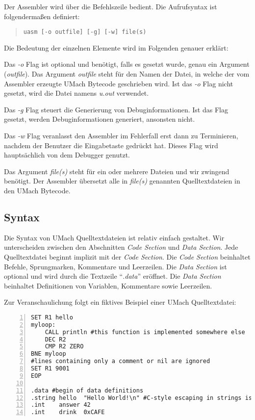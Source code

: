 Der Assembler wird über die Befehlszeile bedient. Die Aufrufsyntax ist folgendermaßen
definiert:
\begin{quote}\texttt{uasm [-o outfile] [-g] [-w] file(s)}\end{quote}
Die Bedeutung der einzelnen Elemente wird im Folgenden genauer erklärt:

Das \emph{-o} Flag ist optional und benötigt, falls es gesetzt wurde, genau ein
Argument (\emph{outfile}). Das Argument \emph{outfile} steht für den Namen der
Datei, in welche der vom Assembler erzeugte UMach Bytecode geschrieben wird. Ist 
das \emph{-o} Flag nicht gesetzt, wird die Datei namens \emph{u.out} verwendet.

Das \emph{-g} Flag steuert die Generierung von Debuginformationen. Ist das Flag
gesetzt, werden Debuginformationen generiert, ansonsten nicht.

Das \emph{-w} Flag veranlasst den Assembler im Fehlerfall erst dann zu Terminieren,
nachdem der Benutzer die Eingabetaste gedrückt hat. Dieses Flag wird hauptsächlich
von dem Debugger genutzt.

Das Argument \emph{file(s)} steht für ein oder mehrere Dateien und wir zwingend
benötigt. Der Assembler übersetzt alle in \emph{file(s)} genannten Quelltextdateien
in den UMach Bytecode.

\subsection{Syntax}

Die Syntax von UMach Quelltextdateien ist relativ einfach gestaltet. Wir
unterscheiden zwischen den Abschnitten \emph{Code Section} und \emph{Data Section}.
Jede Quelltextdatei beginnt implizit mit der \emph{Code Section}. Die
\emph{Code Section} beinhaltet Befehle, Sprungmarken, Kommentare und Leerzeilen.
Die \emph{Data Section} ist optional und wird durch die Textzeile ``\emph{.data}''
eröffnet. Die \emph{Data Section} beinhaltet Definitionen von Variablen,
Kommentare sowie Leerzeilen.

Zur Veranschaulichung folgt ein fiktives Beispiel einer UMach Quelltextdatei:

\begin{lstlisting}[numbers=left, numberstyle=\tiny]
SET R1 hello
myloop:
    CALL println #this function is implemented somewhere else
    DEC R2
    CMP R2 ZERO
BNE myloop
#lines containing only a comment or nil are ignored
SET R1 9001
EOP

.data #begin of data definitions
.string hello  "Hello World!\n" #C-style escaping in strings is OK
.int    answer 42
.int    drink  0xCAFE
\end{lstlisting}

